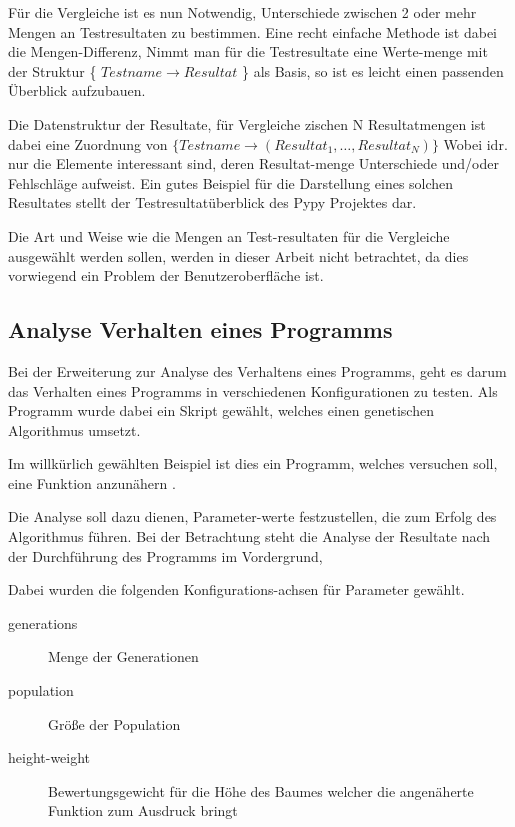 Für die Vergleiche ist es nun Notwendig,
Unterschiede zwischen 2 oder mehr Mengen an Testresultaten zu bestimmen.
Eine recht einfache Methode ist dabei die Mengen-Differenz,
Nimmt man für die Testresultate eine Werte-menge mit der Struktur \{ $Testname \rightarrow Resultat$ \} als Basis,
so ist es leicht einen passenden Überblick aufzubauen.

Die Datenstruktur der Resultate, für Vergleiche zischen N Resultatmengen
ist dabei eine Zuordnung von
$\{ Testname \rightarrow ( Resultat_{1},\ldots,Resultat_{N})\}$
Wobei idr. nur die Elemente interessant sind,
deren Resultat-menge Unterschiede und/oder Fehlschläge aufweist.
Ein gutes Beispiel für die Darstellung eines solchen Resultates
stellt der Testresultatüberblick des Pypy Projektes \cite{pypy:overview} dar.

Die Art und Weise wie die Mengen an Test-resultaten für die Vergleiche ausgewählt werden sollen, werden in dieser Arbeit nicht betrachtet,
da dies vorwiegend ein Problem der Benutzeroberfläche ist.

\subsection{Analyse Verhalten eines Programms}

Bei der Erweiterung zur Analyse des Verhaltens eines Programms,
geht es darum das Verhalten eines Programms
in verschiedenen Konfigurationen zu testen.
Als Programm wurde dabei ein Skript gewählt,
welches einen genetischen Algorithmus umsetzt.

Im willkürlich gewählten Beispiel ist dies ein Programm,
welches versuchen soll, eine Funktion anzunähern \cite{gen:prog}.

Die Analyse soll dazu dienen, Parameter-werte festzustellen,
die zum Erfolg des Algorithmus führen.
Bei der Betrachtung steht die Analyse der Resultate nach der Durchführung des Programms im Vordergrund,

Dabei wurden die folgenden Konfigurations-achsen für Parameter gewählt.

\begin{description}
    \item[generations] Menge der Generationen
    \item[population] Größe der Population
    \item[height-weight] Bewertungsgewicht für die Höhe des Baumes welcher die angenäherte Funktion zum Ausdruck bringt
\end{description}

